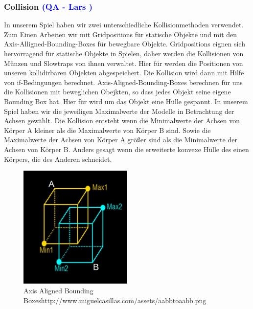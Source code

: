 \documentclass[12pt]{article}
\begin{document}
\vspace{1cm}
\subsubsection{Collision \textcolor{blue}{(QA - Lars )}}

In unserem Spiel haben wir zwei unterschiedliche Kollisionmethoden verwendet.
Zum Einen Arbeiten wir mit Gridpositions für statische Objekte und mit den
Axis-Alligned-Bounding-Boxes für bewegbare Objekte.\newline
\newline
Gridpositions eignen sich hervorragend für statische Objekte in Spielen, daher werden die Kollisionen
von Münzen und Slowtraps von ihnen verwaltet. Hier für werden die Positionen von unseren kollidirbaren
Objekten abgespeichert. Die Kollision wird dann mit Hilfe von if-Bedingungen berechnet.\newline
\newline
Axis-Aligned-Bounding-Boxes berechnen für uns die Kollisionen mit beweglichen Obejkten, so dass jedes Objekt seine eigene
Bounding Box hat. Hier für wird um das Objekt eine Hülle gespannt. In unserem Spiel haben wir die jeweiligen Maximalwerte
der Modelle in Betrachtung der Achsen gewählt. Die Kollision entsteht wenn die Minimalwerte der Achsen von Körper A kleiner
als die Maximalwerte von Körper B sind. Sowie die Maximalwerte der Achsen von Körper A größer sind als die Minimalwerte der
Achsen von Körper B. Anders gesagt wenn die erweiterte konvexe Hülle des einen Körpers, die des Anderen schneidet.

\begin{figure}
	\centering
	\includegraphics[width=0.5\textwidth]{AABB}
	\caption{Axis Aligned Bounding Boxes\newline \tiny http://www.miguelcasillas.com/assets/aabbtoaabb.png
		\label{fig:AABB}}
\end{figure}
\end{document}
